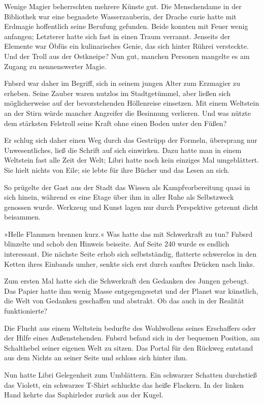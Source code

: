 Wenige Magier beherrschten mehrere Künste gut. Die Menschendame in der Bibliothek war eine begnadete Wasserzauberin, der Drache curie hatte mit Erdmagie hoffentlich seine Berufung gefunden. Beide konnten mit Feuer wenig anfangen; Letzterer hatte sich fast in einen Traum verrannt. Jenseits der Elemente war Öbfüs ein kulinarisches Genie, das sich hinter Rührei versteckte. Und der Troll aus der Ostkneipe? Nun gut, manchen Personen mangelte es am Zugang zu nennenswerter Magie.

Fnbsrd war daher im Begriff, sich in seinem jungen Alter zum Erzmagier zu erheben. Seine Zauber waren nutzlos im Stadtgetümmel, aber ließen sich möglicherweise auf der bevorstehenden Höllenreise einsetzen. Mit einem Weltstein an der Stirn würde mancher Angreifer die Besinnung verlieren. Und was nützte dem stärksten Felstroll seine Kraft ohne einen Boden unter den Füßen?

Er schlug sich daher einen Weg durch das Gestrüpp der Formeln, übersprang nur Unwesentliches, ließ die Schrift auf sich einwirken. Dazu hatte man in einem Weltstein fast alle Zeit der Welt; Libri hatte noch kein einziges Mal umgeblättert. Sie hielt nichts von Eile; sie lebte für ihre Bücher und das Lesen an sich.

So prügelte der Gast aus der Stadt das Wissen als Kampfvorbereitung quasi in sich hinein, während es eine Etage über ihm in aller Ruhe als Selbstzweck genossen wurde. Werkzeug und Kunst lagen nur durch Perspektive getrennt dicht beisammen.

»Helle Flammen brennen kurz.« Was hatte das mit Schwerkraft zu tun? Fnbsrd blinzelte und schob den Hinweis beiseite. Auf Seite 240 wurde es endlich interessant. Die nächste Seite erhob sich selbstständig, flatterte schwerelos in den Ketten ihres Einbands umher, senkte sich erst durch sanftes Drücken nach links.

Zum ersten Mal hatte sich die Schwerkraft den Gedanken des Jungen gebeugt. Das Papier hatte ihm wenig Masse entgegengesetzt und der Planet war künstlich, die Welt von Gedanken geschaffen und abstrakt. Ob das auch in der Realität funktionierte?

Die Flucht aus einem Weltstein bedurfte des Wohlwollens seines Erschaffers oder der Hilfe eines Außenstehenden. Fnbsrd befand sich in der bequemen Position, am Schalthebel seiner eigenen Welt zu sitzen. Das Portal für den Rückweg entstand aus dem Nichts an seiner Seite und schloss sich hinter ihm.

Nun hatte Libri Gelegenheit zum Umblättern. Ein schwarzer Schatten durchstieß das Violett, ein schwarzes T-Shirt schluckte das heiße Flackern. In der linken Hand kehrte das Saphirleder zurück aus der Kugel.

